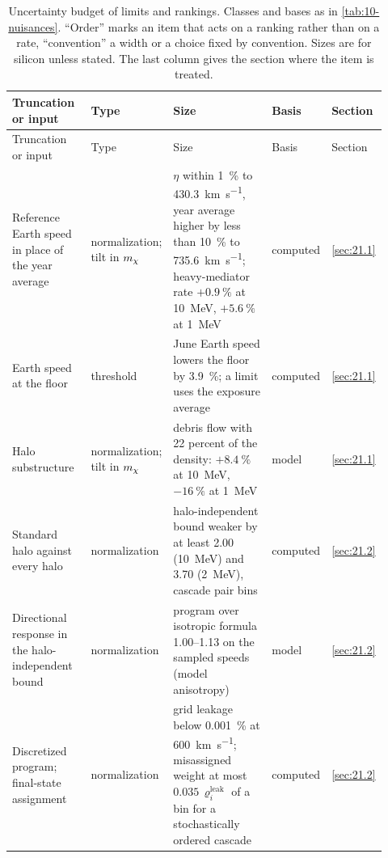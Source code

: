 {\scriptsize\setlength{\tabcolsep}{3pt}\setlength{\LTcapwidth}{\textwidth}
\begin{longtable}{@{}>{\raggedright\arraybackslash}p{0.25\linewidth}>{\raggedright\arraybackslash}p{0.12\linewidth}>{\raggedright\arraybackslash}p{0.38\linewidth}>{\raggedright\arraybackslash}p{0.09\linewidth}>{\raggedright\arraybackslash}p{0.08\linewidth}@{}}
  \caption{Uncertainty budget of limits and rankings. Classes and bases as in \cref{tab:10-nuisances}. ``Order'' marks an item that acts on a ranking rather than on a rate, ``convention'' a width or a choice fixed by convention. Sizes are for silicon unless stated. The last column gives the section where the item is treated.}
  \label{tab:21-nuisances}\\
  \toprule
  Truncation or input & Type & Size & Basis & Section \\
  \midrule
  \endfirsthead
  \toprule
  Truncation or input & Type & Size & Basis & Section \\
  \midrule
  \endhead
  \bottomrule
  \endfoot
  Reference Earth speed in place of the year average & normali\-zation; tilt in $m_{\chi}$ & $\eta$ within \SI{1}{\percent} to \SI{430.3}{km.s^{-1}}, year average higher by less than \SI{10}{\percent} to \SI{735.6}{km.s^{-1}}; heavy-mediator rate $+\SI{0.9}{\percent}$ at \SI{10}{MeV}, $+\SI{5.6}{\percent}$ at \SI{1}{MeV} & computed & \cref{sec:21.1} \\
  \midrule
  Earth speed at the floor & threshold & June Earth speed lowers the floor by \SI{3.9}{\percent}; a limit uses the exposure average & computed & \cref{sec:21.1} \\
  \midrule
  Halo substructure & normali\-zation; tilt in $m_{\chi}$ & debris flow with 22 percent of the density: $+\SI{8.4}{\percent}$ at \SI{10}{MeV}, $-\SI{16}{\percent}$ at \SI{1}{MeV} & model & \cref{sec:21.1} \\
  \midrule
  Standard halo against every halo & normali\-zation & halo-independent bound weaker by at least 2.00 (\SI{10}{MeV}) and 3.70 (\SI{2}{MeV}), cascade pair bins & computed & \cref{sec:21.2} \\
  \midrule
  Directional response in the halo-independent bound & normali\-zation & program over isotropic formula 1.00--1.13 on the sampled speeds (model anisotropy) & model & \cref{sec:21.2} \\
  \midrule
  Discretized program; final-state assignment & normali\-zation & grid leakage below \SI{0.001}{\percent} at \SI{600}{km.s^{-1}}; misassigned weight at most $0.035\,\varrho^{\mathrm{leak}}_i$ of a bin for a stochastically ordered cascade & computed & \cref{sec:21.2} \\

\end{longtable}}
